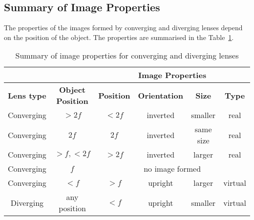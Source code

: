 \subsection{Summary of Image Properties}
The properties of the images formed by converging and diverging lenses depend on the position of the object. The properties are summarised in the Table~\ref{tab:p:wsl:go11:l:summary}.

\begin{table}[htbp]
\begin{center}
\caption{Summary of image properties for converging and diverging lenses}
\label{tab:p:wsl:go11:l:summary}
\begin{tabular}{|c|c|c|c|c|c|}\hline
\multicolumn{2}{|c|}{}&\multicolumn{4}{c|}{\textbf{Image Properties}}\\\hline
\textbf{Lens type} & \textbf{Object Position} & \textbf{Position} & \textbf{Orientation} & \textbf{Size} & \textbf{Type}\\ \hline
Converging & $>2f$ & $<2f$ & inverted & smaller & real\\ \hline
Converging & $2f$ & $2f$ & inverted & same size & real\\ \hline
Converging & $>f,<2f$ & $>2f$ & inverted & larger & real\\ \hline
Converging & $f$ & \multicolumn{4}{c|}{no image formed}\\ \hline
Converging & $<f$ & $>f$ & upright & larger & virtual\\ \hline
Diverging & any position & $<f$ & upright & smaller& virtual\\

\hline
\end{tabular}
\end{center}
\end{table}


